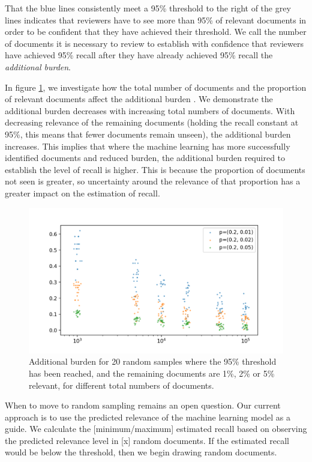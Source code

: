 \documentclass{bmcart}
\begin{document}
	That the blue lines consistently meet a 95\% threshold to the right of the grey lines indicates that reviewers have to see more than 95\% of relevant documents in order to be confident that they have achieved their threshold. 
	We call the number of documents it is necessary to review to establish with confidence that reviewers have achieved 95\% recall after they have already achieved 95\% recall the \textit{additional burden}. 
	
	In figure \ref{additional-burden}, we investigate how the total number of documents and the proportion of relevant documents affect the additional burden . We demonstrate the additional burden decreases  with increasing total numbers of documents. With decreasing relevance of the remaining documents (holding the recall constant at 95\%, this means that fewer documents remain unseen), the additional burden increases. This implies that where the machine learning has more successfully identified documents and reduced burden, the additional burden required to establish the level of recall is higher. This is because the proportion of documents not seen is greater, so uncertainty around the relevance of that proportion has a greater impact on the estimation of recall.
		
	\begin{figure}
		\includegraphics[width=\linewidth]{../images/additional_burden}
		\caption{Additional burden for 20 random samples where the 95\% threshold has been reached, and the remaining documents are 1\%, 2\% or 5\% relevant, for different total numbers of documents.}
		\label{additional-burden}
	\end{figure}

	When to move to random sampling remains an open question. Our current approach is to use the predicted relevance of the machine learning model as a guide. We calculate the [minimum/maximum] estimated recall based on observing the predicted relevance level in [x] random documents. If the estimated recall would be below the threshold, then we begin drawing random documents.
\end{document}
